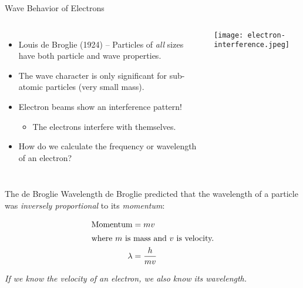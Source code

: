 \documentclass[notes]{beamer}
\begin{document}
\begin{frame}{Wave Behavior of Electrons}
	\begin{columns}
		\begin{itemize} 
			\item Louis de Broglie (1924) -- Particles of \emph{all} sizes
				have both particle and wave properties.
			\item The wave character is only significant for sub-atomic
				particles (very small mass).
			\item Electron beams show an interference pattern!
				\begin{itemize}
					\item The electrons interfere with
						themselves.
				\end{itemize}
			\item<2-> How do we calculate the frequency or
				wavelength of an electron?
		\end{itemize}
		\centering
		\texttt{[image: electron-interference.jpeg]}
	\end{columns}
\end{frame}

\begin{frame}{The de Broglie Wavelength}
	de Broglie predicted that the wavelength of a particle was
	\emph{inversely proportional} to its \emph{momentum}:

	\begin{align*}
		\text{Momentum} &= mv \\
		\intertext{where $m$ is mass and $v$ is velocity.}
		\lambda &= \frac{h}{mv} \\
	\end{align*}

	\begin{center}
		\emph{If we know the velocity of an electron, we also know its
		wavelength.}
	\end{center}
\end{frame}
\end{document}
